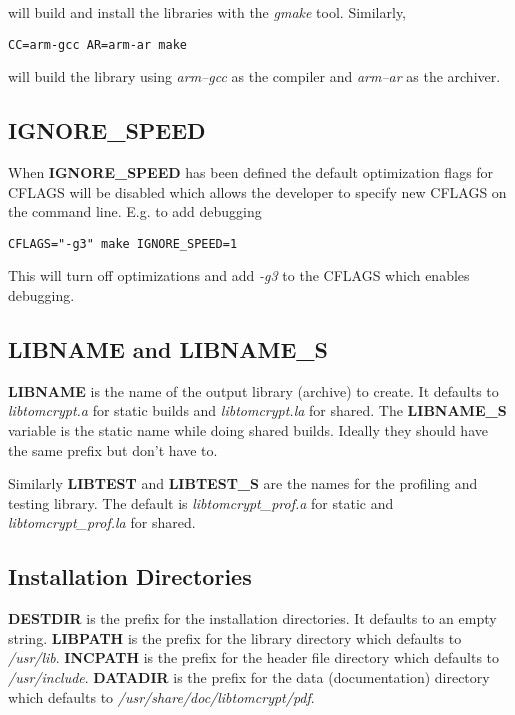\documentclass[synpaper]{book}
\begin{document}
\begin{flushleft} will build and install the libraries with the \textit{gmake} tool.  Similarly, \end{flushleft}

\begin{verbatim}
CC=arm-gcc AR=arm-ar make 
\end{verbatim}

\begin{flushleft} will build the library using \textit{arm--gcc} as the compiler and \textit{arm--ar} as the archiver. \end{flushleft}

\subsection{IGNORE\_SPEED}
When \textbf{IGNORE\_SPEED} has been defined the default optimization flags for CFLAGS will be disabled which allows the developer to specify new
CFLAGS on the command line.  E.g. to add debugging

\begin{verbatim}
CFLAGS="-g3" make IGNORE_SPEED=1
\end{verbatim}

This will turn off optimizations and add \textit{-g3} to the CFLAGS which enables debugging.  

\subsection{LIBNAME and LIBNAME\_S}
 
\textbf{LIBNAME} is the name of the output library (archive) to create.  It defaults to \textit{libtomcrypt.a} for static builds and \textit{libtomcrypt.la} for
shared.  The \textbf{LIBNAME\_S} variable is the static name while doing shared builds.  Ideally they should have the same prefix but don't have to.

 
Similarly \textbf{LIBTEST} and \textbf{LIBTEST\_S} are the names for the profiling and testing library.  The default is \textit{libtomcrypt\_prof.a} for 
static and \textit{libtomcrypt\_prof.la} for shared.

\subsection{Installation Directories}
   
\textbf{DESTDIR} is the prefix for the installation directories.  It defaults to an empty string.  \textbf{LIBPATH} is the prefix for the library
directory which defaults to \textit{/usr/lib}.  \textbf{INCPATH} is the prefix for the header file directory which defaults to \textit{/usr/include}.  
\textbf{DATADIR} is the prefix for the data (documentation) directory which defaults to \textit{/usr/share/doc/libtomcrypt/pdf}.
\end{document}
